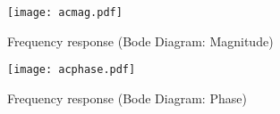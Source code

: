 \vspace{-0.9in}

\begin{figure}[H] \centering
\texttt{[image: acmag.pdf]}
\caption{Frequency response (Bode Diagram: Magnitude)}
\label{fig:acmag}
\end{figure}

\vspace{-1in}

\begin{figure}[H] \centering
\texttt{[image: acphase.pdf]}
\caption{Frequency response (Bode Diagram: Phase)}
\label{fig:acphase}
\end{figure}

\newpage


